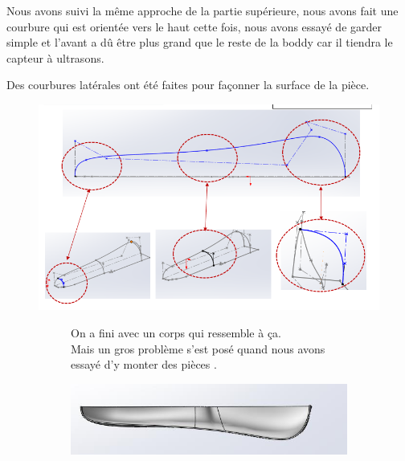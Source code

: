 \FloatBarrier

Nous avons suivi la même approche de la partie supérieure, nous avons fait une courbure qui est orientée vers le haut cette fois, nous avons essayé de garder simple et l’avant a dû être plus grand que le reste de la boddy car il tiendra le capteur à ultrasons.

Des courbures latérales ont été faites pour façonner la surface de la pièce.


\begin{figure}[!htbp]
    \centering
    \includegraphics[width=\linewidth]{assets/conception1/15.png}
\end{figure}

\FloatBarrier

\begin{figure}[!htbp]
    \centering
    \begin{subfigure}[m]{.2\linewidth}
        On a fini avec un corps qui ressemble à ça. \\
        Mais un gros problème s’est posé quand nous avons essayé d’y monter des pièces .
    \end{subfigure}
    \hfill
    \begin{subfigure}{.75\linewidth}
        \centering
        \includegraphics[width=\linewidth]{assets/conception1/img236.jpg}
    \end{subfigure}
\end{figure}

